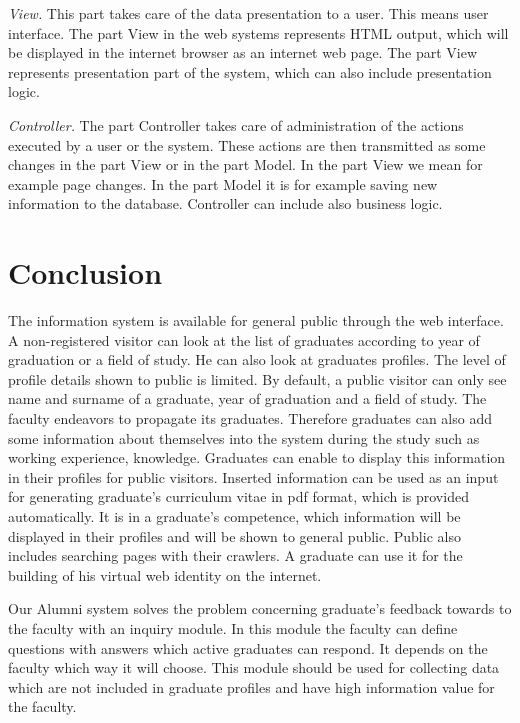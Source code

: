 \documentclass{iitsrc}[2006/14/02]
\begin{document}
{\em View.} This part takes care of the data presentation to a user. This means user interface.  The part View in the web systems represents HTML output, which will be displayed in the internet browser as an internet web page. The part View represents presentation part of the system, which can also include presentation logic.

{\em Controller.} The part Controller takes care of administration of the actions executed by a user or the system. These actions are then transmitted as some changes in the part View or in the part Model. In the part View we mean for example page changes. In the part Model it is for example saving new information to the database. Controller can include also business logic.
      
\section{Conclusion}

The information system is available for general public through the web interface. A non-registered visitor can look at the list of graduates according to year of graduation or a field of study. He can also look at graduates profiles. The level of profile details shown to public is limited. By default, a public visitor can only see name and surname of a graduate, year of graduation and a field of study. The faculty endeavors to propagate its graduates. Therefore graduates can also add some information about themselves into the system during the study such as working experience, knowledge. Graduates can enable to display this information in their profiles for public visitors. Inserted information can be used as an input for generating graduate's curriculum vitae in pdf format, which is provided automatically. It is in a graduate's competence, which information will be displayed in their profiles and will be shown to general public. Public also includes searching pages with their crawlers. A graduate can use it for the building of his virtual web identity on the internet. 

Our Alumni system solves the problem concerning graduate's feedback towards to the faculty with an inquiry module. In this module the faculty can define questions with answers which active graduates can respond. It depends on the faculty which way it will choose. This module should be used for collecting data which are not included in graduate profiles and have high information value for the faculty.

  

\nocite{team14}
\nocite{team15}
\nocite{cakephp}



\end{document}
